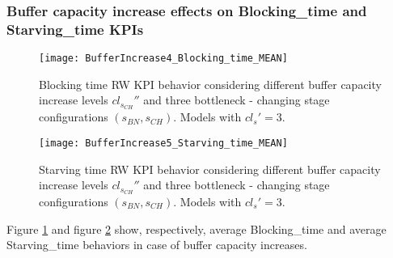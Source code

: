 \subsubsection{Buffer capacity increase effects on Blocking\_time and Starving\_time KPIs}
\begin{figure}[h] 
\centering
\texttt{[image: BufferIncrease4\_Blocking\_time\_MEAN]}
\caption[Blocking time RW KPI behavior with different buffer capacity increase levels]{Blocking time RW KPI behavior considering different buffer capacity increase levels $cl_{s_{CH}}''$ and three bottleneck - changing stage configurations $(s_{BN},s_{CH})$. Models with $cl_s'=3$.}
\label{fig:Blocking time RW KPI behavior with different buffer capacity increase levels}
\end{figure}
\begin{figure}[h] 
\centering
\texttt{[image: BufferIncrease5\_Starving\_time\_MEAN]}
\caption[Starving time RW KPI behavior with different buffer capacity decrease levels]{Starving time RW KPI behavior considering different buffer capacity increase levels $cl_{s_{CH}}''$ and three bottleneck - changing stage configurations $(s_{BN},s_{CH})$. Models with $cl_s'=3$.}
\label{fig:Starving time RW KPI behavior with different buffer capacity increase levels}
\end{figure}
Figure \ref{fig:Blocking time RW KPI behavior with different buffer capacity increase levels} and figure \ref{fig:Starving time RW KPI behavior with different buffer capacity increase levels} show, respectively, average Blocking\_time and average Starving\_time behaviors in case of buffer capacity increases. 
